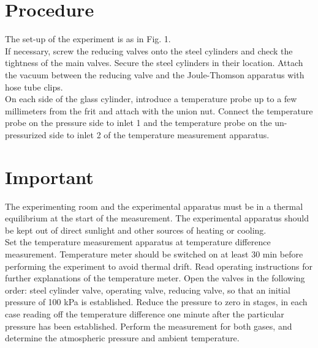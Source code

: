 \documentclass[
	letterpaper, %
	10pt, %
]{CSUniSchoolLabReport}
\begin{document}
\section{Procedure}
The set-up of the experiment is as in Fig. 1. \\
If necessary, screw the reducing valves onto the steel cylinders and check the tightness of the main valves. Secure the steel cylinders in their location. Attach the vacuum between the reducing valve and the Joule-Thomson apparatus with hose tube clips.\\
On each side of the glass cylinder, introduce a temperature probe up to a few millimeters from the frit and attach with the union nut. Connect the temperature probe on the pressure side to inlet 1 and the temperature probe on the un-pressurized side to inlet 2 of the temperature measurement apparatus.
\section{Important}
The experimenting room and the experimental apparatus must be in a thermal equilibrium at the start of the measurement. The experimental apparatus should be kept out of direct sunlight and other sources of heating or cooling.\\
Set the temperature measurement apparatus at temperature difference measurement. Temperature meter should be switched on at least 30 min before performing the experiment to avoid thermal drift. Read operating instructions for further explanations of the temperature meter. Open the valves in the following order: steel cylinder valve, operating valve, reducing valve, so that an initial pressure of 100 kPa is established.
Reduce the pressure to zero in stages, in each case reading off the temperature difference one minute after the particular pressure has been established. Perform the measurement for both gases, and determine the
atmospheric pressure and ambient temperature.
\end{document}
